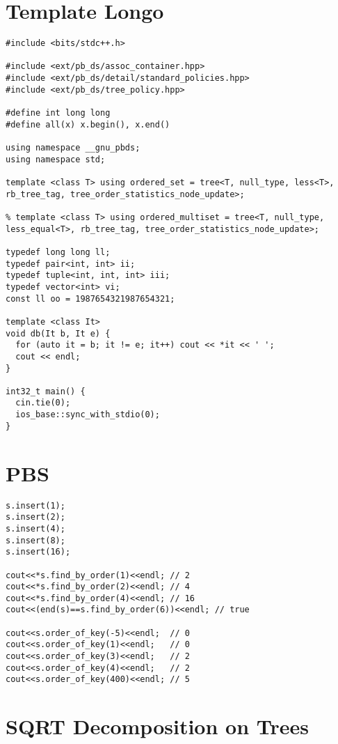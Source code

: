 \documentclass[a4paper]{article}
\begin{document}
\tableofcontents



\section{Template Longo}
\begin{lstlisting}
#include <bits/stdc++.h>

#include <ext/pb_ds/assoc_container.hpp>
#include <ext/pb_ds/detail/standard_policies.hpp>
#include <ext/pb_ds/tree_policy.hpp>

#define int long long
#define all(x) x.begin(), x.end()

using namespace __gnu_pbds;
using namespace std;

template <class T> using ordered_set = tree<T, null_type, less<T>, rb_tree_tag, tree_order_statistics_node_update>;

% template <class T> using ordered_multiset = tree<T, null_type, less_equal<T>, rb_tree_tag, tree_order_statistics_node_update>;

typedef long long ll;
typedef pair<int, int> ii;
typedef tuple<int, int, int> iii;
typedef vector<int> vi;
const ll oo = 1987654321987654321;

template <class It>
void db(It b, It e) {
  for (auto it = b; it != e; it++) cout << *it << ' ';
  cout << endl;
}

int32_t main() {
  cin.tie(0);
  ios_base::sync_with_stdio(0);
}

\end{lstlisting}



\section{PBS}
\begin{lstlisting}
s.insert(1);
s.insert(2);
s.insert(4);
s.insert(8);
s.insert(16);

cout<<*s.find_by_order(1)<<endl; // 2
cout<<*s.find_by_order(2)<<endl; // 4
cout<<*s.find_by_order(4)<<endl; // 16
cout<<(end(s)==s.find_by_order(6))<<endl; // true

cout<<s.order_of_key(-5)<<endl;  // 0
cout<<s.order_of_key(1)<<endl;   // 0
cout<<s.order_of_key(3)<<endl;   // 2
cout<<s.order_of_key(4)<<endl;   // 2
cout<<s.order_of_key(400)<<endl; // 5
\end{lstlisting}


 
\section{SQRT Decomposition on Trees}
\end{document}
